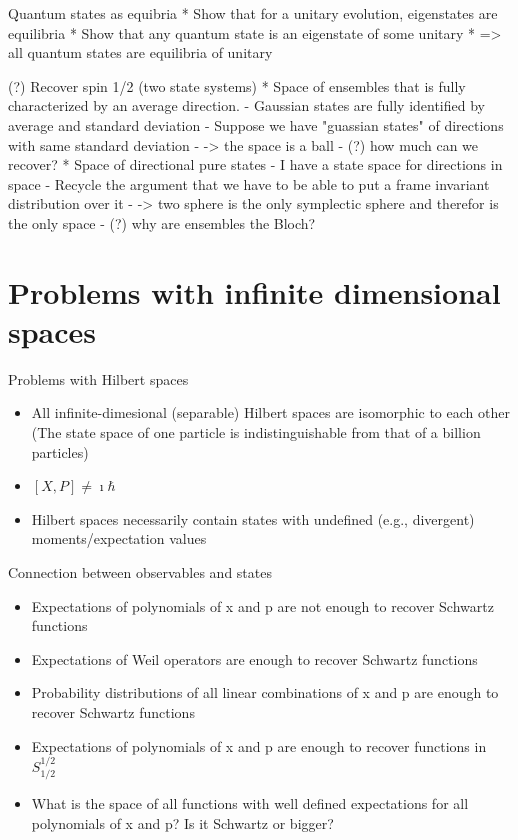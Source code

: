 Quantum states as equibria
* Show that for a unitary evolution, eigenstates are equilibria
* Show that any quantum state is an eigenstate of some unitary
* => all quantum states are equilibria of unitary

(?) Recover spin 1/2 (two state systems)
* Space of ensembles that is fully characterized by an average direction.
  - Gaussian states are fully identified by average and standard deviation
  - Suppose we have "guassian states" of directions with same standard deviation
  - -> the space is a ball
  - (?) how much can we recover?
* Space of directional pure states
  - I have a state space for directions in space
  - Recycle the argument that we have to be able to put a frame invariant distribution over it
  - -> two sphere is the only symplectic sphere and therefor is the only space
  - (?) why are ensembles the Bloch?

\section{Problems with infinite dimensional spaces}

Problems with Hilbert spaces
\begin{itemize}
	\item All infinite-dimesional (separable) Hilbert spaces are isomorphic to each other (The state space of one particle is indistinguishable from that of a billion particles)
	\item $[X, P] \neq \imath \hbar$
	\item Hilbert spaces necessarily contain states with undefined (e.g., divergent) moments/expectation values
\end{itemize}

Connection between observables and states
\begin{itemize}
	\item Expectations of polynomials of x and p are not enough to recover Schwartz functions
	\item Expectations of Weil operators are enough to recover Schwartz functions
	\item Probability distributions of all linear combinations of x and p are enough to recover Schwartz functions
	\item Expectations of polynomials of x and p are enough to recover functions in $S^{1/2}_{1/2}$
	\item What is the space of all functions with well defined expectations for all polynomials of x and p? Is it Schwartz or bigger?
\end{itemize}


